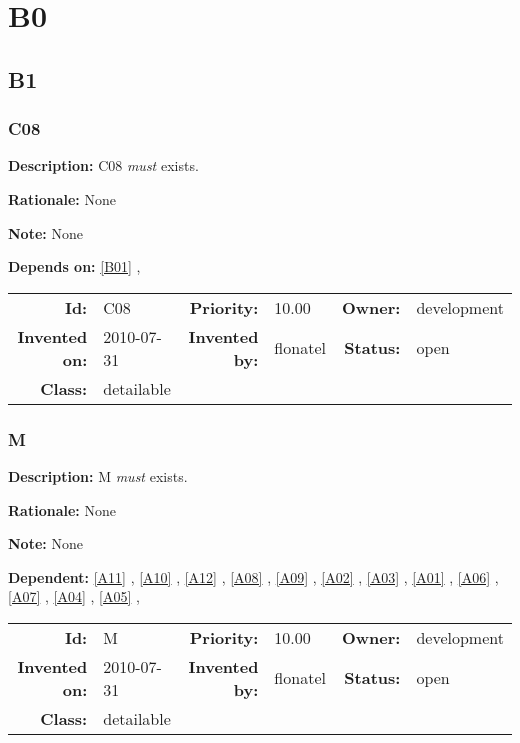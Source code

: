 \chapter{B0}
\section{B1}
\subsection{C08}\label{C08}
\textbf{Description:} C08 \textsl{must} exists.

\textbf{Rationale:} None

\textbf{Note:} None

\textbf{Depends on:} \ref{B01} , 

\par
{\small \begin{center}\begin{tabular}{rlrlrl}
\textbf{Id:} & C08 & \textbf{Priority:} & 10.00 & \textbf{Owner:} & development \\ 
\textbf{Invented on:} & 2010-07-31 & \textbf{Invented by:} & flonatel & \textbf{Status:} & open \\ 
\textbf{Class:} & detailable & & & & \\ 
\end{tabular}\end{center} }%
\subsection{M}\label{M}
\textbf{Description:} M \textsl{must} exists.

\textbf{Rationale:} None

\textbf{Note:} None

\textbf{Dependent:} \ref{A11} , \ref{A10} , \ref{A12} , \ref{A08} , \ref{A09} , \ref{A02} , \ref{A03} , \ref{A01} , \ref{A06} , \ref{A07} , \ref{A04} , \ref{A05} , 

\par
{\small \begin{center}\begin{tabular}{rlrlrl}
\textbf{Id:} & M & \textbf{Priority:} & 10.00 & \textbf{Owner:} & development \\ 
\textbf{Invented on:} & 2010-07-31 & \textbf{Invented by:} & flonatel & \textbf{Status:} & open \\ 
\textbf{Class:} & detailable & & & & \\ 
\end{tabular}\end{center} }%

